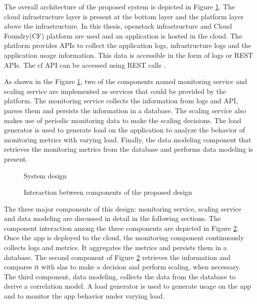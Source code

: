 \documentclass[article,type=msc,colorback,12pt,accentcolor=tud8b,table]{tudthesis}
\begin{document}
	The overall architecture of the proposed system is depicted in Figure \ref{fig:system_design}. The cloud infrastructure layer is present at the bottom layer and the platform layer above the infrastructure. In this thesis, openstack infrastructure and Cloud Foundry(CF) platform are used and an application is hosted in the cloud. The platform provides APIs to collect the application logs, infrastructure logs and the application usage information. This data is accessible in the form of logs or REST APIs. The \gls{cf} API can be accessed using REST calls \cite{cf_summary}. 
	
	As shown in the Figure \ref{fig:system_design}, two of the components named monitoring service and scaling service are implemented as services that could be provided by the platform. The monitoring service collects the information from logs and API, parses them and persists the information in a database. The scaling service also makes use of periodic monitoring data to make the scaling decisions. The load generator is used to generate load on the application to analyze the behavior of monitoring metrics with varying load. Finally, the data modeling component that retrieves the monitoring metrics from the database and performs data modeling is present.

 			 \begin{figure}
 			 	\begin{center}
 			 	\end{center}
 			 	\caption{System design}
 			 	\label{fig:system_design}
 			 \end{figure}
 

 			 \begin{figure}
 			 	\begin{center}
 			 	\end{center}
 			 	\caption{Interaction between components of the proposed design}
 			 	\label{fig:system_component_interaction}
 			 \end{figure}

	The three major components of this design: monitoring service, scaling service and data modeling are discussed in detail in the following sections. The component interaction among the three components are depicted in Figure \ref{fig:system_component_interaction}. Once the app is deployed to the cloud, the monitoring component continuously collects logs and metrics. It aggregates the metrics and persists them in a database. The second component of Figure \ref{fig:system_component_interaction} retrieves the information and compares it with \gls{sla}s to make a decision and perform scaling, when necessary. The third component, data modeling, collects the data from the database to derive a correlation model. A load generator is used to generate usage on the app and to monitor the app behavior under varying load.
\end{document}
